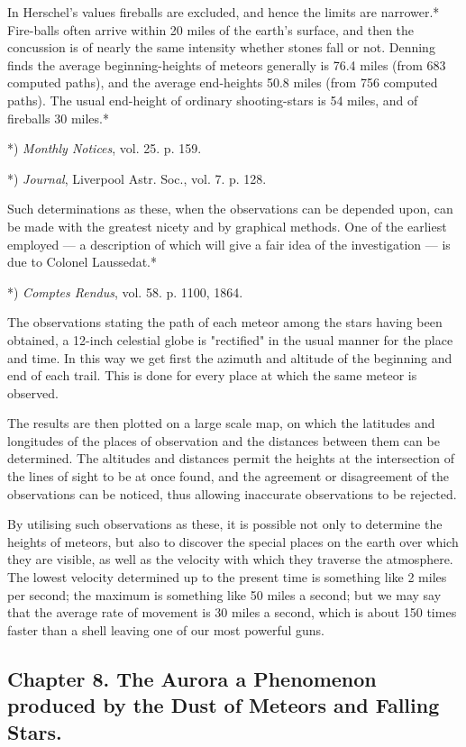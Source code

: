 \documentclass[a4paper, 12pt, oneside, polutonikogreek, english]{article}
\begin{document}
In Herschel's values fireballs are excluded, and hence the limits are narrower.* Fire-balls often arrive within 20 miles of the earth's surface, and then the concussion is of nearly the same intensity whether stones fall or not. Denning finds the average beginning-heights of meteors generally is 76.4 miles (from 683 computed paths), and the average end-heights 50.8 miles (from 756 computed paths). The usual end-height of ordinary shooting-stars is 54 miles, and of fireballs 30 miles.*

*) \emph{Monthly Notices}, vol. 25. p. 159.

*) \emph{Journal}, Liverpool Astr. Soc., vol. 7. p. 128.

Such determinations as these, when the observations can be depended upon, can be made with the greatest nicety and by graphical methods. One of the earliest employed --- a description of which will give a fair idea of the investigation --- is due to Colonel Laussedat.*

*) \emph{Comptes Rendus}, vol. 58. p. 1100, 1864.

The observations stating the path of each meteor among the stars having been obtained, a 12-inch celestial globe is "rectified" in the usual manner for the place and time. In this way we get first the azimuth and altitude of the beginning and end of each trail. This is done for every place at which the same meteor is observed.

The results are then plotted on a large scale map, on which the latitudes and longitudes of the places of observation and the distances between them can be determined. The altitudes and distances permit the heights at the intersection of the lines of sight to be at once found, and the agreement or disagreement of the observations can be noticed, thus allowing inaccurate observations to be rejected.

By utilising such observations as these, it is possible not only to determine the heights of meteors, but also to discover the special places on the earth over which they are visible, as well as the velocity with which they traverse the atmosphere. The lowest velocity determined up to the present time is something like 2 miles per second; the maximum is something like 50 miles a second; but we may say that the average rate of movement is 30 miles a second, which is about 150 times faster than a shell leaving one of our most powerful guns.

\subsection{Chapter 8. The Aurora a Phenomenon produced by the Dust of Meteors and Falling Stars.}
\end{document}
